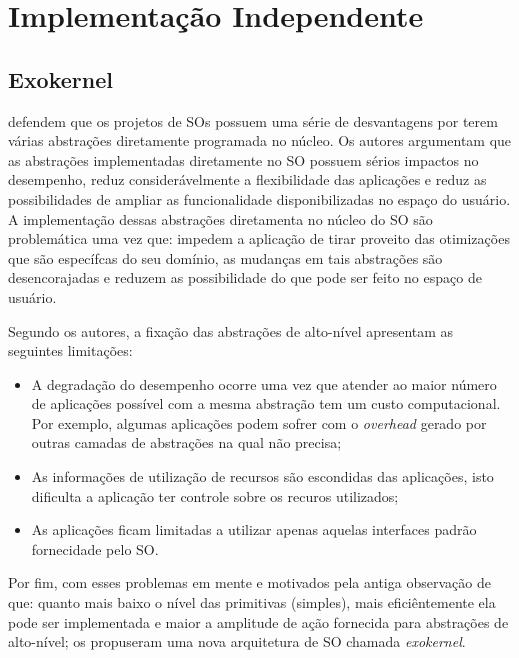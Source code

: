 \section{Implementação Independente}

\subsection{Exokernel}

\cite{exokernel} defendem que os projetos de SOs possuem uma série de
desvantagens por terem várias abstrações diretamente programada no núcleo. Os
autores argumentam que as abstrações implementadas diretamente no SO possuem
sérios impactos no desempenho, reduz considerávelmente a flexibilidade das
aplicações e reduz as possibilidades de ampliar as funcionalidade
disponibilizadas no espaço do usuário. A implementação dessas abstrações
diretamenta no núcleo do SO são problemática uma vez que: impedem a aplicação
de tirar proveito das otimizações que são específcas do seu domínio, as
mudanças em tais abstrações são desencorajadas e reduzem as possibilidade do
que pode ser feito no espaço de usuário.

Segundo os autores, a fixação das abstrações de alto-nível apresentam as
seguintes limitações:
\begin{itemize}
  \item A degradação do desempenho ocorre uma vez que atender ao maior número
        de aplicações possível com a mesma abstração tem um custo
        computacional. Por exemplo, algumas aplicações podem sofrer com o
        \emph{overhead} gerado por outras camadas de abstrações na qual não
        precisa;
  \item As informações de utilização de recursos são escondidas das aplicações,
        isto dificulta a aplicação ter controle sobre os recuros utilizados;
  \item As aplicações ficam limitadas a utilizar apenas aquelas interfaces
        padrão fornecidade pelo SO.
\end{itemize}
Por fim, com esses problemas em mente e motivados pela antiga observação de que:
quanto mais baixo o nível das primitivas (simples), mais eficiêntemente ela
pode ser implementada e maior a amplitude de ação fornecida para abstrações de
alto-nível; os propuseram uma nova arquitetura de SO chamada \emph{exokernel}.

